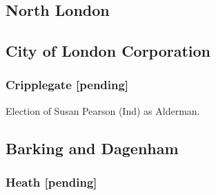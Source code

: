 \documentclass[a4paper,openany]{book}
\begin{document}
\begin{resultsiii}

%
%
%
%
%

\section{North London}

\subsection*{City of London Corporation}

\subsubsection*{Cripplegate \hspace*{\fill}\nolinebreak[1]%
	\enspace\hspace*{\fill}
	[pending]}


Election of Susan Pearson (Ind) as Alderman.

\subsection*{Barking and Dagenham}

\subsubsection*{Heath \hspace*{\fill}\nolinebreak[1]%
	\enspace\hspace*{\fill}
	[pending]}


\end{resultsiii}
\end{document}
